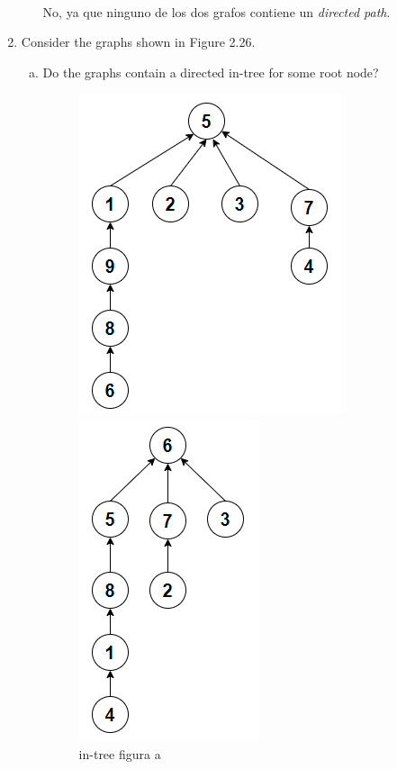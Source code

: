 \documentclass{report}
\begin{document}
\begin{enumerate}[2.1]
\begin{enumerate}[(a)]
        \\ No, ya que ninguno de los dos grafos contiene un \textit{directed path}.
    \end{enumerate} %
    \item Consider the graphs shown in Figure 2.26.
    \begin{enumerate}[(a)]
        \item Do the graphs contain a directed in-tree for some root node?
        \begin{figure}[ht]
            \begin{minipage}[b]{0.4\linewidth}
            \centering
            \includegraphics[scale = 0.5]{2.4incisoafiguraa.jpeg}
            \caption{in-tree figura a}
            \end{minipage}
            \hspace{0.5cm}
            \begin{minipage}[b]{0.4\linewidth}
            \centering
            \includegraphics[scale = 0.5]{2.4incisoafigurab.jpeg}

\end{minipage}
\end{figure}
\end{enumerate}
\end{enumerate}
\end{document}
